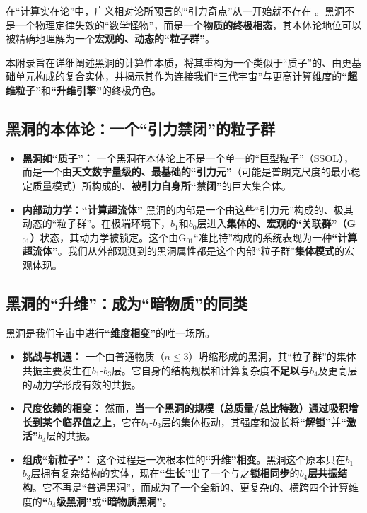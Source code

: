 \documentclass[11pt, a4paper]{article}
\begin{document}
在“计算实在论”中，广义相对论所预言的“引力奇点”从一开始就不存在 \cite{Einstein1905}。黑洞不是一个物理定律失效的“数学怪物”，而是一个\textbf{物质的终极相态}，其本体论地位可以被精确地理解为一个\textbf{宏观的、动态的“粒子群”}。

本附录旨在详细阐述黑洞的计算性本质，将其重构为一个类似于“质子”的、由更基础单元构成的复合实体，并揭示其作为连接我们“三代宇宙”与更高计算维度的\textbf{“超维粒子”}和\textbf{“升维引擎”}的终极角色。

\subsection{黑洞的本体论：一个“引力禁闭”的粒子群}

\begin{itemize}
    \item \textbf{黑洞如“质子”：}
    一个黑洞在本体论上不是一个单一的“巨型粒子”（SSOL），而是一个由\textbf{天文数字量级的、最基础的“引力元”}（可能是普朗克尺度的最小稳定质量模式）所构成的、\textbf{被引力自身所“禁闭”}的巨大集合体。
    \item \textbf{内部动力学：“计算超流体”}
    黑洞的内部是一个由这些“引力元”构成的、极其动态的“粒子群”。在极端环境下，$b_1$和$b_0$层进入\textbf{集体的、宏观的“关联群”（G$_{01}$）}状态，其动力学被锁定。这个由G$_{01}$“准比特”构成的系统表现为一种\textbf{“计算超流体”}。我们从外部观测到的黑洞属性都是这个内部“粒子群”\textbf{集体模式}的宏观体现。
\end{itemize}

\subsection{黑洞的“升维”：成为“暗物质”的同类}

黑洞是我们宇宙中进行\textbf{“维度相变”}的唯一场所。

\begin{itemize}
    \item \textbf{挑战与机遇：}
    一个由普通物质（$n \le 3$）坍缩形成的黑洞，其“粒子群”的集体共振主要发生在$b_1$-$b_3$层。它自身的结构规模和计算复杂度\textbf{不足以}与$b_4$及更高层的动力学形成有效的共振。
    \item \textbf{尺度依赖的相变：}
    然而，\textbf{当一个黑洞的规模（总质量/总比特数）通过吸积增长到某个临界值之上}，它在$b_1$-$b_3$层的集体振动，其强度和波长将\textbf{“解锁”}并\textbf{“激活”}$b_4$层的共振。
    \item \textbf{组成“新粒子”：}
    这个过程是一次根本性的\textbf{“升维”相变}。黑洞这个原本只在$b_1$-$b_3$层拥有复杂结构的实体，现在\textbf{“生长”}出了一个与之\textbf{锁相同步}的\textbf{$b_4$层共振结构}。它不再是“普通黑洞”，而成为了一个全新的、更复杂的、横跨四个计算维度的\textbf{“$b_4$级黑洞”}或\textbf{“暗物质黑洞”}。
\end{itemize}
\end{document}
